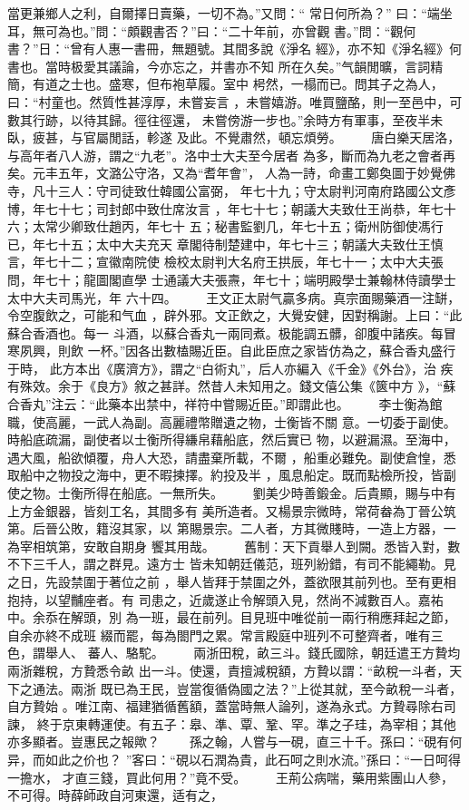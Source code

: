\documentclass{ctexart}
\begin{document}
當更兼鄉人之利，自爾擇日賣藥，一切不為。''又問：`` 常日何所為？'' 曰：``端坐耳，無可為也。''問：``頗觀書否？''曰：``二十年前，亦曾觀 書。''問：``觀何書？''日：``曾有人惠一書冊，無題號。其間多說《淨名 經》，亦不知《淨名經》何書也。當時极愛其議論，今亦忘之，并書亦不知 所在久矣。''气韻閒曠，言詞精簡，有道之士也。盛寒，但布袍草履。室中 枵然，一榻而已。問其子之為人，曰：``村童也。然質性甚淳厚，未嘗妄言 ，未嘗嬉游。唯買鹽酪，則一至邑中，可數其行跡，以待其歸。徑往徑還， 未嘗傍游一步也。''余時方有軍事，至夜半未臥，疲甚，与官屬閒話，軫遂 及此。不覺肅然，頓忘煩勞。 　　唐白樂天居洛，与高年者八人游，謂之``九老''。洛中士大夫至今居者 為多，斷而為九老之會者再矣。元丰五年，文潞公守洛，又為``耆年會''， 人為一詩，命畫工鄭奐圖于妙覺佛寺，凡十三人：守司徒致仕韓國公富弼， 年七十九；守太尉判河南府路國公文彥博，年七十七；司封郎中致仕席汝言 ，年七十七；朝議大夫致仕王尚恭，年七十六；太常少卿致仕趙丙，年七十 五；秘書監劉几，年七十五；衛州防御使馮行已，年七十五；太中大夫充天 章閣待制楚建中，年七十三；朝議大夫致仕王慎言，年七十二；宣徽南院使 檢校太尉判大名府王拱辰，年七十一；太中大夫張問，年七十；龍圖閣直學 士通議大夫張燾，年七十；端明殿學士兼翰林侍讀學士太中大夫司馬光，年 六十四。 　　王文正太尉气贏多病。真宗面賜藥酒一注缾，令空腹飲之，可能和气血 ，辟外邪。文正飲之，大覺安健，因對稱謝。上曰：``此蘇合香酒也。每一 斗酒，以蘇合香丸一兩同煮。极能調五髒，卻腹中諸疾。每冒寒夙興，則飲 一杯。''因各出數榼賜近臣。自此臣庶之家皆仿為之，蘇合香丸盛行于時， 此方本出《廣濟方》，謂之``白術丸''，后人亦編入《千金》《外台》，治 疾有殊效。余于《良方》敘之甚詳。然昔人未知用之。錢文僖公集《篋中方 》，``蘇合香丸''注云：``此藥本出禁中，祥符中嘗賜近臣。''即謂此也。 　　李士衡為館職，使高麗，一武人為副。高麗禮幣贈遺之物，士衡皆不關 意。一切委于副使。時船底疏漏，副使者以士衡所得縑帛藉船底，然后實已 物，以避漏濕。至海中，遇大風，船欲傾覆，舟人大恐，請盡棄所載，不爾 ，船重必難免。副使倉惶，悉取船中之物投之海中，更不暇揀擇。約投及半 ，風息船定。既而點檢所投，皆副使之物。士衡所得在船底。一無所失。 　　劉美少時善鍛金。后貴顯，賜与中有上方金銀器，皆刻工名，其間多有 美所造者。又楊景宗微時，常荷畚為丁晉公筑第。后晉公敗，籍沒其家，以 第賜景宗。二人者，方其微賤時，一造上方器，一為宰相筑第，安敢自期身 饗其用哉。 　　舊制：天下貢舉人到闕。悉皆入對，數不下三千人，謂之群見。遠方士 皆未知朝廷儀范，班列紛錯，有司不能繩勒。見之日，先設禁圍于著位之前 ，舉人皆拜于禁圍之外，蓋欲限其前列也。至有更相抱持，以望黼座者。有 司患之，近歲遂止令解頭入見，然尚不減數百人。嘉祐中。余忝在解頭，別 為一班，最在前列。目見班中唯從前一兩行稍應拜起之節，自余亦終不成班 綴而罷，每為閤門之累。常言殿庭中班列不可整齊者，唯有三色，謂舉人、 蕃人、駱駝。 　　兩浙田稅，畝三斗。錢氏國除，朝廷遣王方贄均兩浙雜稅，方贄悉令畝 出一斗。使還，責擅減稅額，方贄以謂：``畝稅一斗者，天下之通法。兩浙 既已為王民，豈當復循偽國之法？''上從其就，至今畝稅一斗者，自方贄始 。唯江南、福建猶循舊額，蓋當時無人論列，遂為永式。方贄尋除右司諫， 終于京東轉運使。有五子：皋、準、覃、鞏、罕。準之子珪，為宰相；其他 亦多顯者。豈惠民之報歟？ 　　孫之翰，人嘗与一硯，直三十千。孫曰：``硯有何异，而如此之价也？ ''客曰：``硯以石潤為貴，此石呵之則水流。''孫曰：``一日呵得一擔水， 才直三錢，買此何用？''竟不受。 　　王荊公病喘，藥用紫團山人參，不可得。時薛師政自河東還，适有之， 
\end{document}
